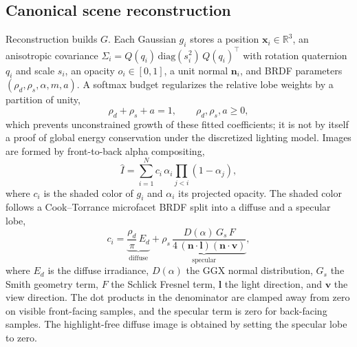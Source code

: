 \documentclass[pdflatex,lineno,referee,sn-vancouver,Numbered]{sn-jnl}
\begin{document}
\subsection{Canonical scene reconstruction}
\label{sec:tier1}
Reconstruction builds $G$. Each Gaussian $g_i$ stores a position
$\mathbf{x}_i \in \mathbb{R}^3$, an anisotropic covariance
$\Sigma_i = Q(q_i)\,\mathrm{diag}(s_i^2)\,Q(q_i)^{\top}$ with rotation
quaternion $q_i$ and scale $s_i$, an opacity $o_i \in [0,1]$, a unit normal
$\mathbf{n}_i$, and BRDF parameters $(\rho_d, \rho_s, \alpha, m, a)$. A
softmax budget regularizes the relative lobe weights by a partition of
unity,
\begin{equation}
\rho_d + \rho_s + a = 1, \qquad \rho_d,\rho_s,a \ge 0,
\label{eq:budget}
\end{equation}
which prevents unconstrained growth of these fitted coefficients; it is
not by itself a proof of global energy conservation under the discretized
lighting model. Images are formed by front-to-back alpha compositing,
\begin{equation}
\hat{I} = \sum_{i=1}^{N} c_i\,\alpha_i \prod_{j<i}(1-\alpha_j),
\label{eq:render}
\end{equation}
where $c_i$ is the shaded color of $g_i$ and $\alpha_i$ its projected
opacity. The shaded color follows a Cook--Torrance microfacet BRDF
\cite{cooktorrance} split into a diffuse and a specular lobe,
\begin{equation}
c_i = \underbrace{\frac{\rho_d}{\pi}\,E_d}_{\text{diffuse}}
+ \underbrace{\rho_s\,\frac{D(\alpha)\,G_s\,F}{4\,(\mathbf{n}\cdot\mathbf{l})(\mathbf{n}\cdot\mathbf{v})}}_{\text{specular}},
\label{eq:cooktorrance}
\end{equation}
where $E_d$ is the diffuse irradiance, $D(\alpha)$ the GGX normal
distribution, $G_s$ the Smith geometry term, $F$ the Schlick Fresnel term,
$\mathbf{l}$ the light direction, and $\mathbf{v}$ the view direction. The
dot products in the denominator are clamped away from zero on visible
front-facing samples, and the specular term is zero for back-facing
samples. The
highlight-free diffuse image is obtained by setting the specular lobe to
zero.
\end{document}
